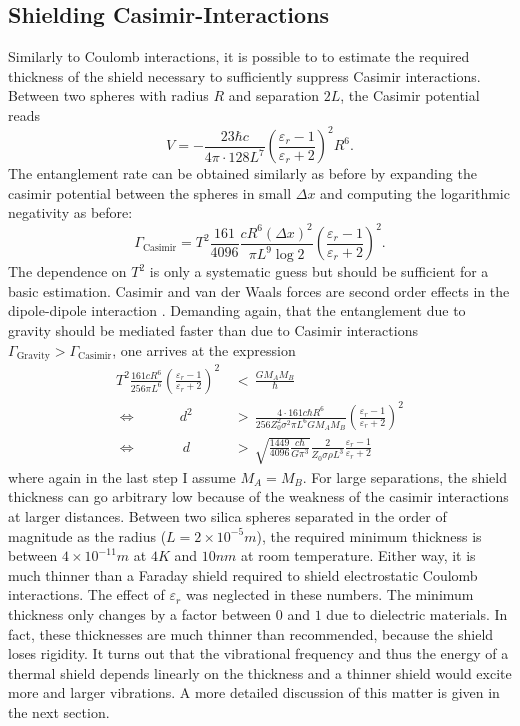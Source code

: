 \subsection{Shielding Casimir-Interactions}
Similarly to Coulomb interactions, it is possible to to estimate the required thickness of the shield necessary to sufficiently suppress Casimir interactions. Between two spheres with radius $R$ and separation $2L$, the Casimir potential reads \cite{Emig_2007}
\begin{equation}
  V = -\frac{23 \hbar c}{4\pi \cdot 128 L^7} \left( \frac{\varepsilon_r - 1}{\varepsilon_r + 2} \right)^2 R^6 .
\end{equation}
The entanglement rate can be obtained similarly as before by expanding the casimir potential between the spheres in small $\Delta x$ and computing the logarithmic negativity as before:
\begin{equation}
  \Gamma_\mathrm{Casimir} = T^2 \frac{161}{4096} \frac{c R^6 (\Delta x)^2}{\pi L^9 \log 2}\left( \frac{\varepsilon_r - 1}{\varepsilon_r + 2}\right)^2 .
\end{equation}
The dependence on $T^2$ is only a systematic guess but should be sufficient for a basic estimation. Casimir and van der Waals forces are second order effects in the dipole-dipole interaction \cite{Bordag_2001}.
Demanding again, that the entanglement due to gravity should be mediated faster than due to Casimir interactions $\Gamma_\mathrm{Gravity} > \Gamma_\mathrm{Casimir}$, one arrives at the expression
\begin{align}
  T^2 \frac{161 c R^6}{256 \pi L^6} \left( \frac{\varepsilon_r - 1}{\varepsilon_r + 2}\right)^2 \, &< \, \frac{G M_A M_B}{\hbar} \\
  \Longleftrightarrow \quad\quad\quad d^2 \, &> \, \frac{4 \cdot 161 c \hbar R^6}{256 Z_0^2 \sigma^2 \pi L^6 G M_A M_B} \left( \frac{\varepsilon_r - 1}{\varepsilon_r + 2}\right)^2 \\
  \Longleftrightarrow \quad\quad\quad\  d \, &> \, \sqrt{\frac{1449}{4096} \frac{c \hbar}{G \pi^3}} \frac{2}{Z_0 \sigma \rho L^3} \frac{\varepsilon_r - 1}{\varepsilon_r + 2}
\end{align}
where again in the last step I assume $M_A = M_B$. For large separations, the shield thickness can go arbitrary low because of the weakness of the casimir interactions at larger distances. Between two silica spheres separated in the order of magnitude as the radius ($L = 2\times 10^{-5}\si{m}$), the required minimum thickness is between $4\times 10^{-11}\si{m}$ at $4\si{K}$ and $10 \si{nm}$ at room temperature.
Either way, it is much thinner than a Faraday shield required to shield electrostatic Coulomb interactions. The effect of $\varepsilon_r$ was neglected in these numbers. The minimum thickness only changes by a factor between $0$ and $1$ due to dielectric materials.
In fact, these thicknesses are much thinner than recommended, because the shield loses rigidity.
It turns out that the vibrational frequency and thus the energy of a thermal shield depends linearly on the thickness and a thinner shield would excite more and larger vibrations. A more detailed discussion of this matter is given in the next section.



